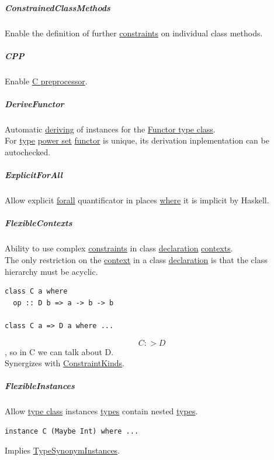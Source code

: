 \documentclass[11pt]{article}
\begin{document}
\subparagraph{\label{orgdeed1b8}ConstrainedClassMethods}
\label{sec:org66d65ec}
Enable the definition of further \hyperref[org76311a9]{constraints} on individual class methods.\\

\subparagraph{\label{org83c856c}CPP}
\label{sec:orgda69ce0}
Enable \href{https://en.wikipedia.org/wiki/C\_preprocessor}{C preprocessor}.\\

\subparagraph{\label{org46d145a}DeriveFunctor}
\label{sec:org4ca5f93}
Automatic \hyperref[orgdecadd4]{deriving} of instances for the \hyperref[org0e7b59c]{Functor type class}.\\
For \hyperref[org4fbaeb8]{type} \hyperref[org05c8b9e]{power set} \hyperref[org6073683]{functor} is unique, its derivation inplementation can be autochecked.\\

\subparagraph{\label{org7f703ef}ExplicitForAll}
\label{sec:orgbdad168}
Allow explicit \hyperref[org746fdae]{forall} quantificator in places \hyperref[orgefd1ecd]{where} it is implicit by Haskell.\\

\subparagraph{\label{org1ccc264}FlexibleContexts}
\label{sec:org6975651}
Ability to use complex \hyperref[org76311a9]{constraints} in class \hyperref[org56ef1b9]{declaration} \hyperref[orgfad9713]{contexts}.\\
The only restriction on the \hyperref[orgd623681]{context} in a class \hyperref[org56ef1b9]{declaration} is that the class hierarchy must be acyclic.\\
\begin{verbatim}
class C a where
  op :: D b => a -> b -> b

class C a => D a where ...
\end{verbatim}
$$ C :> D $$, so in C we can talk about D.\\

Synergizes with \hyperref[orgc8a9924]{ConstraintKinds}.\\

\subparagraph{\label{org942c073}FlexibleInstances}
\label{sec:org1ade537}
Allow \hyperref[orga4a5066]{type class} instances \hyperref[org3927fd9]{types} contain nested \hyperref[org3927fd9]{types}.\\
\begin{verbatim}
instance C (Maybe Int) where ...
\end{verbatim}
Implies \hyperref[org4f19817]{TypeSynonymInstances}.\\
\end{document}
